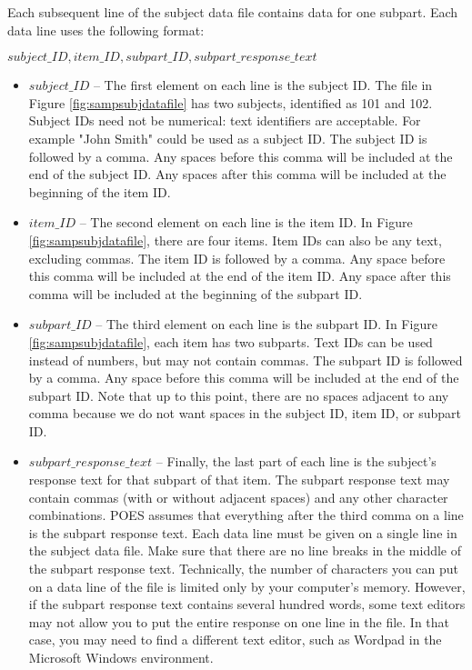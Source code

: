\documentclass[11pt]{article}
\numberwithin{figure}{section}
\numberwithin{table}{section}
\begin{document}
Each subsequent line of the subject data file contains data for one subpart.  Each data line uses the following format:

\begin{center}$subject\_ID,item\_ID,subpart\_ID,subpart\_response\_text$\end{center}


\begin{itemize}
\item[] $subject\_ID$ -- The first element on each line is the subject ID.  The file in Figure \ref{fig:sampsubjdatafile} has two subjects, identified as 101 and 102.  Subject IDs need not be numerical: text identifiers are acceptable.  For example "John Smith" could be used as a subject ID.  The subject ID is followed by a comma.  Any spaces before this comma will be included at the end of the subject ID.  Any spaces after this comma will be included at the beginning of the item ID.

\item[] $item\_ID$ -- The second element on each line is the item ID.  In Figure \ref{fig:sampsubjdatafile}, there are four items.  Item IDs can also be any text, excluding commas.  The item ID is followed by a comma.  Any space before this comma will be included at the end of the item ID.  Any space after this comma will be included at the beginning of the subpart ID.

\item[] $subpart\_ID$ -- The third element on each line is the subpart ID.  In Figure \ref{fig:sampsubjdatafile}, each item has two subparts.  Text IDs can be used instead of numbers, but may not contain commas.  The subpart ID is followed by a comma.  Any space before this comma will be included at the end of the subpart ID.  Note that up to this point, there are no spaces adjacent to any comma because we do not want spaces in the subject ID, item ID, or subpart ID.

\item[] $subpart\_response\_text$ -- Finally, the last part of each line is the subject's response text for that subpart of that item.  The subpart response text may contain commas (with or without adjacent spaces) and any other character combinations.  POES assumes that everything after the third comma on a line is the subpart response text.  Each data line must be given on a single line in the subject data file.  Make sure that there are no line breaks in the middle of the subpart response text.  Technically, the number of characters you can put on a data line of the file is limited only by your computer's memory.  However, if the subpart response text contains several hundred words, some text editors may not allow you to put the entire response on one line in the file.  In that case, you may need to find a different text editor, such as Wordpad in the Microsoft Windows environment.
\end{itemize}
\end{document}

